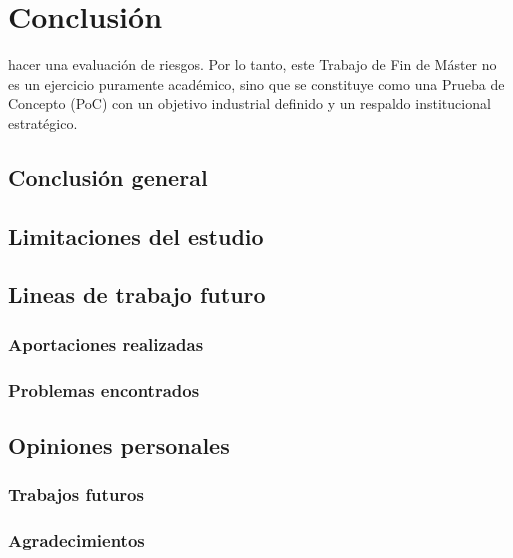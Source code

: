 \documentclass[12pt,a4paper,onecolumn,oneside]{report}
\begin{document}
\chapter{Conclusión} %
hacer una evaluación de riesgos.
Por lo tanto, este Trabajo de Fin de Máster no es un ejercicio puramente académico, sino que se constituye como una Prueba de Concepto (PoC) con un objetivo industrial definido y un respaldo institucional estratégico.
\section{Conclusión general}
\label{sec:Conclusión general}
\section{Limitaciones del estudio}
\label{sec:Limitaciones del estudio}
\section{Lineas de trabajo futuro}
\label{sec:Lineas de trabajo futuro}

\subsection*{Aportaciones realizadas}

\subsection*{Problemas encontrados}

\section*{Opiniones personales}
\label{sec:Opiniones personales}

\subsection*{Trabajos futuros}
\subsection*{Agradecimientos}


\renewcommand\bibname{Bibliografía}

\nocite{*}

\end{document}
